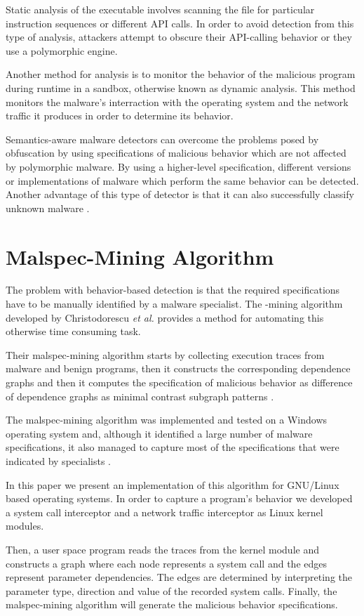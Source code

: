 Static analysis of the executable involves scanning the file for particular instruction sequences or different API calls. In order to avoid detection from this type of analysis, attackers attempt to obscure their API-calling behavior or they use a polymorphic engine.

Another method for analysis is to monitor the behavior of the malicious program during runtime in a sandbox, otherwise known as dynamic analysis. This method monitors the malware's interraction with the operating system and the network traffic it produces in order to determine its behavior.

Semantics-aware malware detectors can overcome the problems posed by obfuscation by using specifications of malicious behavior which are not affected by polymorphic malware. By using a higher-level specification, different versions or implementations of malware which perform the same behavior can be detected. Another advantage of this type of detector is that it can also successfully classify unknown malware \cite{semantics-based-detection}.

\section{Malspec-Mining Algorithm}
\label{sec:malspec-alg}

The problem with behavior-based detection is that the required specifications have to be manually identified by a malware specialist. The -mining algorithm developed by Christodorescu \textit{et al.} \cite{mining-specifications} provides a method for automating this otherwise time consuming task. 

Their malspec-mining algorithm starts by collecting execution traces from malware and benign programs, then it constructs the corresponding dependence graphs and then it computes the specification of malicious behavior as difference of dependence graphs as minimal contrast subgraph patterns \cite{minimal-contrast-subgraph}.

The malspec-mining algorithm was implemented and tested on a Windows operating system and, although it identified a large number of malware specifications, it also managed to capture most of the specifications that were indicated by specialists \cite{mining-specifications}.

In this paper we present an implementation of this algorithm for GNU/Linux based operating systems. In order to capture a program’s behavior we developed a system call interceptor and a network traffic interceptor as Linux kernel modules.

Then, a user space program reads the traces from the kernel module and constructs a graph where each node represents a system call and the edges represent parameter dependencies. The edges are determined by interpreting the parameter type, direction and value of the recorded system calls. Finally, the malspec-mining algorithm will generate the malicious behavior specifications.
